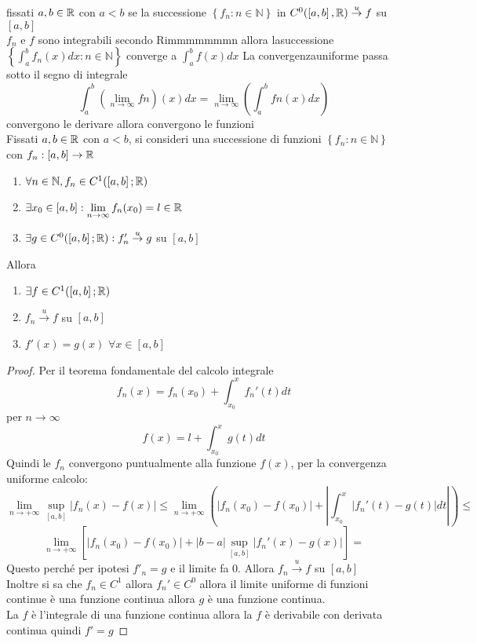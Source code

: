 \proposition
fissati $a,b\in \mathbb{R}$ con $a<b$ se la successione $\left\{f_n:n\in\mathbb{N}\right\}$ in $C^0(\left[a,b\right], \mathbb{R})\overset{u}{\to}f$ su $\left[a,b\right]$\\
$f_n$ e $f$ sono integrabili secondo Rimmmmmmmn allora lasuccessione $\left\{\int_a^bf_n(x)dx:n\in\mathbb{N}\right\}$ converge a $\int_a^bf(x)dx$
\observation
La convergenzauniforme passa sotto il segno di integrale 
$$\int_a^b\left(\lim\limits_{n\to\infty}fn\right)(x)dx=\lim\limits_{n\to\infty}\left(\int_a^bfn(x)dx\right)$$
\proposition convergono le derivare allora convergono le funzioni\\
Fissati $a,b\in \mathbb{R}$ con $a<b$, si consideri una successione di funzioni $\left\{f_n:n\in\mathbb{N}\right\}$ con $f_n:\left[a,b\right]\to \mathbb{R}$
\begin{enumerate}
	\item $\forall n\in\mathbb{N}, f_n\in C^1(\left[a,b\right]; \mathbb{R})$
	\item $\exists x_0\in\left[a,b\right]: \lim\limits_{n\to\infty}f_n(x_0)=l\in \mathbb{R}$
	\item $\exists g \in C^0(\left[a,b\right]; \mathbb{R}):f'_n\overset{u}{\to}g$ su $\left[a,b\right]$
\end{enumerate}
Allora
\begin{enumerate}
	\item $\exists f\in C^1(\left[a,b\right]; \mathbb{R})$
	\item $f_n\overset{u}{\to}f$ su $\left[a,b\right]$
	\item $f'(x)=g(x)$ $\forall x\in\left[a,b\right]$
\end{enumerate}
\begin{proof}
	Per il teorema fondamentale del calcolo integrale
	$$f_n(x)=f_n(x_0)+\int_{x_0}^{x}f_n'(t)dt$$
	per $n\to\infty$
	$$f(x)=l+\int_{x_0}^{x}g(t)dt$$
	Quindi le $f_n$ convergono puntualmente alla funzione $f(x)$, per la convergenza uniforme calcolo:
	$$ \lim\limits_{n\to+\infty}\sup\limits_{\left[a,b\right]}\left|f_n(x)-f(x)\right|\le\lim\limits_{n\to+\infty}\left(  \left| f_n(x_0)-f(x_0) \right|+\left|\int_{x_0}^x\left|f_n'(t)-g(t)\right|dt\right| \right)\le$$
	$$\lim\limits_{n\to+\infty}\left[ \left|f_n(x_0)-f(x_0)\right|+\left|b-a\right|\sup\limits_{\left[a,b\right]}\left|f_n'(x)-g(x)\right| \right] = $$
	Questo perché per ipotesi $f'_n=g$ e il limite fa $0$.
	Allora $f_n\overset{u}{\to}f$ su $\left[a,b\right]$\\
	Inoltre si sa che $f_n\in C^1$ allora $f_n'\in C^0$ allora il limite uniforme di funzioni continue è una funzione continua allora $g$ è una funzione continua.\\
	La $f$ è l'integrale di una funzione continua allora la $f$ è derivabile con derivata continua quindi $f'=g$
\end{proof}

